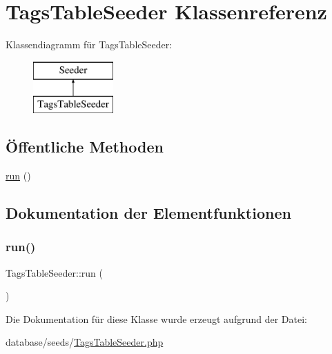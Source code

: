 \hypertarget{classTagsTableSeeder}{}\section{Tags\+Table\+Seeder Klassenreferenz}
\label{classTagsTableSeeder}
Klassendiagramm für Tags\+Table\+Seeder\+:\begin{figure}[H]
\begin{center}
\leavevmode
\includegraphics[height=2.000000cm]{d6/d93/classTagsTableSeeder}
\end{center}
\end{figure}
\subsection*{Öffentliche Methoden}
\begin{DoxyCompactItemize}
\item 
\hyperlink{classTagsTableSeeder_a9cddd705f79977b08740f1dd63a3d0de}{run} ()
\end{DoxyCompactItemize}


\subsection{Dokumentation der Elementfunktionen}
\mbox{\label{classTagsTableSeeder_a9cddd705f79977b08740f1dd63a3d0de}} 
\subsubsection{\texorpdfstring{run()}{run()}}
{\footnotesize\ttfamily Tags\+Table\+Seeder\+::run (\begin{DoxyParamCaption}{ }\end{DoxyParamCaption})}



Die Dokumentation für diese Klasse wurde erzeugt aufgrund der Datei\+:\begin{DoxyCompactItemize}
\item 
database/seeds/\hyperlink{TagsTableSeeder_8php}{Tags\+Table\+Seeder.\+php}\end{DoxyCompactItemize}

